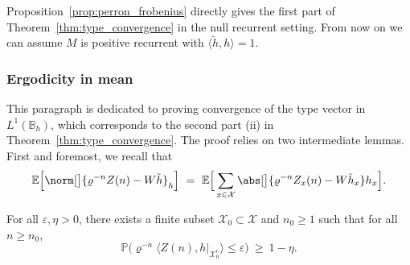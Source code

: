 \begin{refsegment}
 Proposition~\ref{prop:perron_frobenius} directly gives the first part of Theorem~\ref{thm:type_convergence} in the null recurrent setting. From now on we can assume $M$ is positive recurrent with $\langle\tilde{h},h\rangle =1$.

\subsubsection*{Ergodicity in mean} This paragraph is dedicated to proving convergence of the type vector in $L^1(\mathbb{B}_h)$, which corresponds to the second part (ii) in Theorem~\ref{thm:type_convergence}.
The proof relies on two intermediate lemmas. First and foremost, we recall that   
\[
\mathbb{E}\Big[\norm[\big]{\varrho^{-n} Z(n) - W\tilde{h}}_h\Big]\ =\
\mathbb{E}\Big[\sum_{x\in \mathcal{X}} \abs[\big]{\varrho^{-n}Z_x(n) - W\tilde{h}_x} h_x \Big].
\]

\begin{lem}\label{lem:restriction_finite}
    For all $\varepsilon,\eta>0$, there exists a finite subset
    $\mathcal{X}_0\subset \mathcal{X}$ and $n_0\geq 1$ such that
    for all $n\geq n_0$,
    \begin{equation*}
        \mathbb{P}\big(\varrho^{-n}\langle Z(n), h|_{\mathcal{X}_0^c}\rangle\leq \varepsilon\big)\ \geq\ 1-\eta.
    \end{equation*}
\end{lem}


\end{refsegment}
